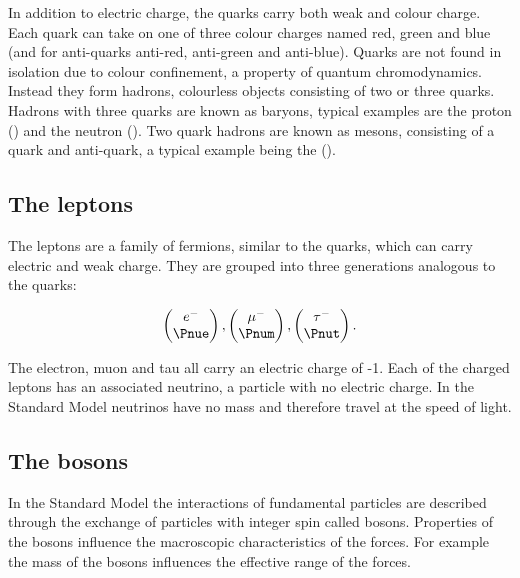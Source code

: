 In addition to electric charge, the quarks carry both weak and colour charge. Each quark can take on one of three colour charges named red, green and blue (and for anti-quarks anti-red, anti-green and anti-blue). Quarks are not found in isolation due to colour confinement, a property of quantum chromodynamics. Instead they form hadrons, colourless objects consisting of two or three quarks. Hadrons with three quarks are known as baryons, typical examples are the proton (\Pup\Pup\Pdown) and the neutron (\Pup\Pdown\Pdown). Two quark hadrons are known as mesons, consisting of a quark and anti-quark, a typical example being the  \Ppiplus (\Pup\APdown).

\subsection{The leptons}
\label{section:particle-physics:SM:leptons}

The leptons are a family of fermions, similar to the quarks, which can carry electric and weak charge. They are grouped into three generations analogous to the quarks:


\begin{equation}
  \begin{pmatrix}
    e^{-} \\
    \Pnue
  \end{pmatrix}
  ,
  \begin{pmatrix}
    \mu^{-} \\
    \Pnum
  \end{pmatrix}
  ,
  \begin{pmatrix}
    \tau^{-} \\
    \Pnut
  \end{pmatrix}
.
\end{equation}

\noindent
The electron, muon and tau all carry an electric charge of -1. Each of the charged leptons has an associated neutrino, a particle with no electric charge. In the Standard Model neutrinos have no mass and therefore travel at the speed of light.


\subsection{The bosons}
\label{section:particle-physics:SM:bosons}

In the Standard Model the interactions of fundamental particles are described through the exchange of particles with integer spin called bosons. Properties of the bosons influence the macroscopic characteristics of the forces. For example the mass of the bosons influences the effective range of the forces.

